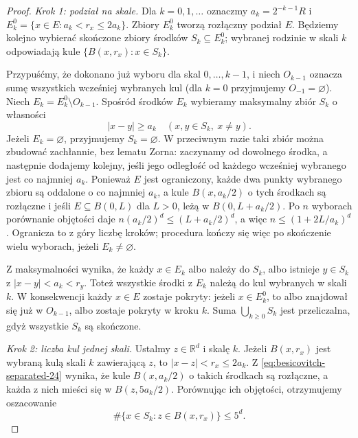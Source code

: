 \begin{proof}
\emph{Krok 1: podział na skale.}
Dla $k=0,1,\ldots$ oznaczmy $a_k=2^{-k-1}R$ i
$E_k^0=\{x\in E:a_k<r_x\le2a_k\}$. Zbiory
$E_k^0$ tworzą rozłączny podział $E$.
Będziemy kolejno wybierać skończone zbiory środków
$S_k\subseteq E_k^0$; wybranej rodzinie w skali $k$
odpowiadają kule $\{B(x,r_x):x\in S_k\}$.

Przypuśćmy, że dokonano już wyboru dla skal
$0,\ldots,k-1$, i niech $O_{k-1}$ oznacza sumę
wszystkich wcześniej wybranych kul (dla $k=0$
przyjmujemy $O_{-1}=\varnothing$).
Niech $E_k=E_k^0\setminus O_{k-1}$. Spośród środków
$E_k$ wybieramy maksymalny zbiór $S_k$ o własności
\begin{equation}\label{eq:besicovitch-separated-24}
 |x-y|\ge a_k\quad(x,y\in S_k,\ x\ne y).
\end{equation}
Jeżeli $E_k=\varnothing$, przyjmujemy $S_k=\varnothing$.
W przeciwnym razie taki zbiór można zbudować zachłannie,
bez lematu Zorna: zaczynamy od dowolnego środka, a następnie
dodajemy kolejny, jeśli jego odległość od każdego
wcześniej wybranego jest co najmniej $a_k$.
Ponieważ $E$ jest ograniczony, każde dwa punkty
wybranego zbioru są oddalone o co najmniej $a_k$,
a kule $B(x,a_k/2)$ o tych środkach są rozłączne
i jeśli $E\subseteq B(0,L)$ dla $L>0$, leżą w
$B(0,L+a_k/2)$. Po $n$ wyborach porównanie objętości
daje $n(a_k/2)^d\le (L+a_k/2)^d$, a więc
$n\le(1+2L/a_k)^d$. Ogranicza to z góry liczbę kroków;
procedura kończy się więc po skończenie wielu
wyborach, jeżeli $E_k\ne\varnothing$.

Z maksymalności wynika, że każdy $x\in E_k$
albo należy do $S_k$, albo istnieje $y\in S_k$
z $|x-y|<a_k<r_y$. Toteż wszystkie środki z
$E_k$ należą do kul wybranych w skali $k$.
W konsekwencji każdy $x\in E$ zostaje pokryty:
jeżeli $x\in E_k^0$, to albo znajdował się już
w $O_{k-1}$, albo zostaje pokryty w kroku $k$.
Suma $\bigcup_{k\ge0}S_k$ jest przeliczalna,
gdyż wszystkie $S_k$ są skończone.

\emph{Krok 2: liczba kul jednej skali.}
Ustalmy $z\in\mathbb R^d$ i skalę $k$.
Jeżeli $B(x,r_x)$ jest wybraną kulą skali $k$
zawierającą $z$, to $|x-z|<r_x\le2a_k$.
Z \eqref{eq:besicovitch-separated-24} wynika, że
kule $B(x,a_k/2)$ o takich środkach są rozłączne,
a każda z nich mieści się w $B(z,5a_k/2)$.
Porównując ich objętości, otrzymujemy oszacowanie
\begin{equation}\label{eq:besicovitch-single-scale-24}
 \#\{x\in S_k:z\in B(x,r_x)\}\le5^d.
\end{equation}


\end{proof}
